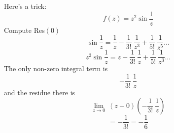\documentclass[11pt, oneside]{article}   	%
\begin{document}
Here's a trick:
\[ f(z) = z^2 \sin \frac{1}{z} \]
Compute Res$(0)$
\[ \sin \frac{1}{z} = \frac{1}{z} - \frac{1}{3!} \ \frac{1}{z^3} + \frac{1}{5!} \ \frac{1}{z^5} \dots \]
\[ z^2 \sin \frac{1}{z} = z - \frac{1}{3!} \ \frac{1}{z} + \frac{1}{5!} \ \frac{1}{z^3} \dots \]
The only non-zero integral term is 
\[ - \frac{1}{3!} \ \frac{1}{z} \]
and the residue there is
\[ \lim_{z \rightarrow 0} \ (z - 0) (- \frac{1}{3!} \ \frac{1}{z}) \]
\[ = - \frac{1}{3!} = - \frac{1}{6} \]
\end{document}
